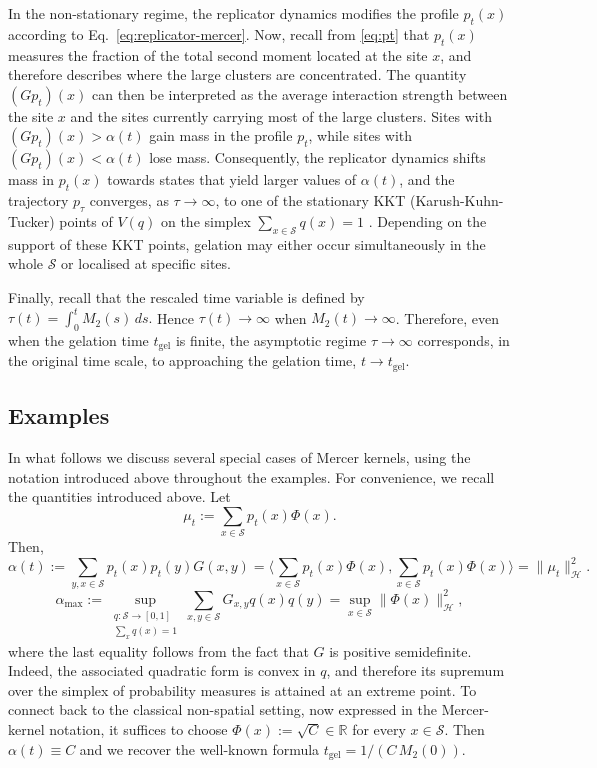 \documentclass[12pt,twoside]{article}
\begin{document}
In the non-stationary regime, the replicator dynamics modifies the profile \(p_t(x)\) according to
Eq.~\eqref{eq:replicator-mercer}.
Now, recall from \eqref{eq:pt} that \(p_t(x)\) measures the fraction of the total second moment located at the site \(x\), and therefore describes where the large clusters are concentrated. The quantity \((Gp_t)(x)\) can then be interpreted as the average interaction strength between the site \(x\) and the sites currently carrying most of the large clusters. Sites with \((Gp_t)(x)>\alpha(t)\) gain mass in the profile \(p_t\), while sites with \((Gp_t)(x)<\alpha(t)\) lose mass. 
Consequently, the replicator dynamics shifts mass in $p_t(x)$
towards states that yield larger values of $\alpha(t)$, and the trajectory $p_\tau$ converges, as $\tau\to\infty$, to one of the stationary KKT (Karush-Kuhn-Tucker) points of $V(q)$ on the simplex $\sum_{x\in\mathcal S} q(x)=1$ \cite{hofbauer1998}. 
Depending on the support of these KKT points, gelation may either occur simultaneously in the whole $\mathcal S$ or localised at specific sites. 

Finally, recall that the rescaled time variable is defined by
$
\tau(t)=\int_0^t M_2(s)\,ds.$
Hence \(\tau(t)\to\infty\)  when \(M_2(t)\to\infty\). Therefore, even when the gelation time \(t_{\mathrm{gel}}\) is finite, the asymptotic regime \(\tau\to\infty\) corresponds, in the original time scale, to approaching the gelation time, \(t\to t_{\mathrm{gel}}\). 

\subsection{Examples}
In what follows we discuss several special cases of Mercer kernels, using the
notation introduced above throughout the examples. For convenience, we recall the quantities introduced above. Let
\[
\mu_t:=\sum_{x\in\mathcal S} p_t(x)\Phi(x).
\]
Then,
\[
\alpha(t):=\sum_{y,x\in\mathcal S} p_t(x)p_t(y)G(x,y)
=\langle\sum_{x\in\mathcal S} p_t(x)\Phi(x),\sum_{x\in\mathcal S} p_t(x)\Phi(x) \rangle = \|\mu_t\|_{\mathcal H}^2.
\]
\[
\alpha_{\max}:=\sup_{\substack{q:\mathcal S\to[0,1]\\ \sum_x q(x)=1}}
\sum_{x,y\in\mathcal S} G_{x,y}q(x)q(y)=\sup_{x\in\mathcal S}\|\Phi(x)\|_{\mathcal H}^2,
\]
where the last equality follows from the fact that $G$ is positive semidefinite. Indeed, the associated quadratic form is convex in $q$, and therefore its supremum over the simplex of probability measures is attained at an extreme point. To connect back to the classical non-spatial setting, now expressed in the
Mercer-kernel notation, it suffices to choose
$\Phi(x):=\sqrt{C}\in\mathbb R$ for every $x\in\mathcal S$.  
Then $\alpha(t)\equiv C$ and we recover the well-known formula
$t_{\mathrm{gel}}=1/(C\,M_2(0))$.  \\
\end{document}
